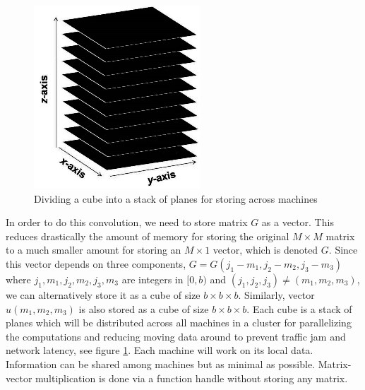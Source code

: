 \documentclass{wap}
\begin{document}
\begin{figure}[htbp]
\centering
\includegraphics[width=0.2\linewidth]{planesstack}
\caption{Dividing a cube into a stack of planes for storing across machines}
\label{fig0}
\end{figure}

In order to do this convolution, we need to store matrix $G$ as a vector. This reduces drastically the amount of memory for storing the original $M\times M$ matrix to a much smaller amount for storing an $M \times 1$ vector, which is denoted $G$. Since this vector depends on three components, $G=G(j_1-m_1,j_2-m_2, j_3-m_3)$ where $j_1, m_1, j_2, m_2, j_3, m_3$ are integers in $[0,b)$ and $(j_1,j_2,j_3) \ne (m_1,m_2,m_3)$, we can alternatively store it as a cube of size $b\times b\times b$. Similarly, vector $u(m_1,m_2,m_3)$ is also stored as a cube of size $b\times b\times b$. Each cube is a stack of planes which will be distributed across all machines in a cluster for parallelizing the computations and reducing moving data around to prevent traffic jam and network latency, see figure \ref{fig0}. Each machine will work on its local data. Information can be shared among machines but as minimal as possible. Matrix-vector multiplication is done via a function handle without storing any matrix.
\end{document}
